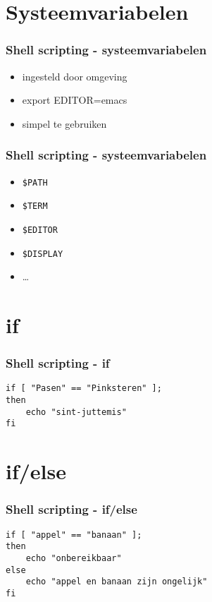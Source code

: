 \documentclass{beamer}
\begin{document}
\section{Systeemvariabelen}

\begin{frame}[fragile]
  \frametitle{Shell scripting - systeemvariabelen}
  \begin{itemize}
  \item<1-> ingesteld door omgeving
  \item<2-> export EDITOR=emacs
  \item<3-> simpel te gebruiken
  \end{itemize}
\end{frame}

\begin{frame}[fragile]
  \frametitle{Shell scripting - systeemvariabelen}
  \begin{itemize}
  \item \texttt{\$PATH}
  \item \texttt{\$TERM}
  \item \texttt{\$EDITOR}
  \item \texttt{\$DISPLAY}
  \item \ldots
  \end{itemize}
\end{frame}

\section{if}

\begin{frame}[fragile]
  \frametitle{Shell scripting - if}
  \begin{lstlisting}
if [ "Pasen" == "Pinksteren" ];
then
    echo "sint-juttemis"
fi
  \end{lstlisting}
\end{frame}

\section{if/else}

\begin{frame}[fragile]
  \frametitle{Shell scripting - if/else}
  \begin{lstlisting}
if [ "appel" == "banaan" ];
then
    echo "onbereikbaar"
else
    echo "appel en banaan zijn ongelijk"
fi
  \end{lstlisting}
\end{frame}
\end{document}
